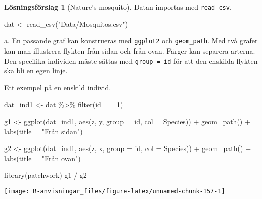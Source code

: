 \documentclass[
]{book}
\newenvironment{Shaded}{\begin{snugshade}}{\end{snugshade}}
\newcommand{\AttributeTok}[1]{\textcolor[rgb]{0.77,0.63,0.00}{#1}}
\newcommand{\DecValTok}[1]{\textcolor[rgb]{0.00,0.00,0.81}{#1}}
\newcommand{\FunctionTok}[1]{\textcolor[rgb]{0.00,0.00,0.00}{#1}}
\newcommand{\NormalTok}[1]{#1}
\newcommand{\OtherTok}[1]{\textcolor[rgb]{0.56,0.35,0.01}{#1}}
\newcommand{\SpecialCharTok}[1]{\textcolor[rgb]{0.00,0.00,0.00}{#1}}
\newcommand{\StringTok}[1]{\textcolor[rgb]{0.31,0.60,0.02}{#1}}
\theoremstyle{definition}
\theoremstyle{definition}
\theoremstyle{definition}
\theoremstyle{definition}
\newtheorem{hypothesis}{Lösningsförslag}[chapter]
\theoremstyle{remark}
\begin{document}
\begin{hypothesis}[Nature's mosquito]
Datan importas med \texttt{read\_csv}.

\begin{Shaded}
\begin{Highlighting}[]
\NormalTok{dat }\OtherTok{\textless{}{-}} \FunctionTok{read\_csv}\NormalTok{(}\StringTok{"Data/Mosquitos.csv"}\NormalTok{)}
\end{Highlighting}
\end{Shaded}

a. En passande graf kan konstrueras med \texttt{ggplot2} och \texttt{geom\_path}. Med två grafer kan man illustrera flykten från sidan och från ovan. Färger kan separera arterna. Den specifika individen måste sättas med \texttt{group\ =\ id} för att den enskilda flykten ska bli en egen linje.

Ett exempel på en enskild individ.

\begin{Shaded}
\begin{Highlighting}[]
\NormalTok{dat\_ind1 }\OtherTok{\textless{}{-}}\NormalTok{ dat }\SpecialCharTok{\%\textgreater{}\%} \FunctionTok{filter}\NormalTok{(id }\SpecialCharTok{==} \DecValTok{1}\NormalTok{)}

\NormalTok{g1 }\OtherTok{\textless{}{-}} \FunctionTok{ggplot}\NormalTok{(dat\_ind1, }\FunctionTok{aes}\NormalTok{(z, y, }\AttributeTok{group =}\NormalTok{ id, }\AttributeTok{col =}\NormalTok{ Species)) }\SpecialCharTok{+} 
  \FunctionTok{geom\_path}\NormalTok{() }\SpecialCharTok{+}
  \FunctionTok{labs}\NormalTok{(}\AttributeTok{title =} \StringTok{"Från sidan"}\NormalTok{)}

\NormalTok{g2 }\OtherTok{\textless{}{-}} \FunctionTok{ggplot}\NormalTok{(dat\_ind1, }\FunctionTok{aes}\NormalTok{(z, x, }\AttributeTok{group =}\NormalTok{ id, }\AttributeTok{col =}\NormalTok{ Species)) }\SpecialCharTok{+} 
  \FunctionTok{geom\_path}\NormalTok{() }\SpecialCharTok{+}
  \FunctionTok{labs}\NormalTok{(}\AttributeTok{title =} \StringTok{"Från ovan"}\NormalTok{)}

\FunctionTok{library}\NormalTok{(patchwork)}
\NormalTok{g1 }\SpecialCharTok{/}\NormalTok{ g2}
\end{Highlighting}
\end{Shaded}

\begin{center}\texttt{[image: R-anvisningar\_files/figure-latex/unnamed-chunk-157-1]} \end{center}


\end{hypothesis}
\end{document}
